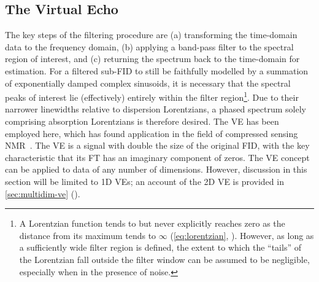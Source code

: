 \subsection{The Virtual Echo}
\label{subsec:ve}
The key steps of the filtering procedure are
(a) transforming the time-domain data to the frequency domain,
(b) applying a band-pass filter to the spectral region of interest, and
(c) returning the spectrum back to the time-domain for estimation.
For a filtered sub-\ac{FID} to still be faithfully modelled by a
summation of exponentially damped complex sinusoids, it is necessary that the
spectral peaks of interest lie (effectively) entirely within the filter
region\footnote{
    A Lorentzian function tends to but never explicitly reaches zero as the
    distance from its maximum tends to $\infty$ (\cref{eq:lorentzian},
    ).
    However, as long as a sufficiently wide filter region is defined, the
    extent to which the ``tails'' of the Lorentzian fall outside the filter
    window can be assumed to be negligible, especially when in the presence of
    noise.
}.
Due to their narrower linewidths relative to dispersion Lorentzians, a phased
spectrum solely comprising absorption Lorentzians is therefore desired.
The \ac{VE} has been employed here, which has found application in the field of
compressed sensing NMR~\cite{Mayzel2014,Golowicz2020,Luo2020}. The \ac{VE} is a
signal with double the size of the original \ac{FID}, with the key
characteristic that its \ac{FT} has an imaginary component of zeros. The
\ac{VE} concept can be applied to data of any number of dimensions. However,
discussion in this section will be limited to \ac{1D} \acp{VE};
an account of the \ac{2D} \ac{VE} is provided in \cref{sec:multidim-ve}
().

